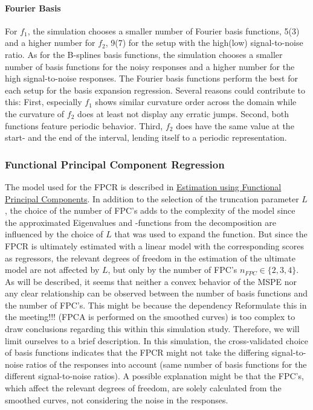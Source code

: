 \documentclass[11pt,twoside,a4paper]{article}
\begin{document}
	\paragraph{Fourier Basis}
	For $f_1$, the simulation chooses a smaller number of Fourier basis functions, 5(3) and a higher number for $f_2$, 9(7) for the setup with the high(low) signal-to-noise ratio. As for the B-splines basis functions, the simulation chooses a smaller number of basis functions for the noisy responses and a higher number for the high signal-to-noise responses. The Fourier basis functions perform the best for each setup for the basis expansion regression. Several reasons could contribute to this: First, especially $f_1$ shows similar curvature order across the domain while the curvature of $f_2$ does at least not display any erratic jumps. Second, both functions feature periodic behavior. Third, $f_2$ does have the same value at the start- and the end of the interval, lending itself to a periodic representation.
	\vspace{-0.2cm}
	
	\subsubsection{Functional Principal Component Regression}
	The model used for the FPCR is described in \hyperref[fpc_exp_transf]{Estimation using Functional Principal Components}. In addition to the selection of the truncation parameter $L$, the choice of the number of FPC's adds to the complexity of the model since the approximated Eigenvalues and -functions from the decomposition are influenced by the choice of $L$ that was used to expand the function. But since the FPCR is ultimately estimated with a linear model with the corresponding scores as regressors, the relevant degrees of freedom in the estimation of the ultimate model are not affected by $L$, but only by the number of FPC's $n_{FPC} \in \{2, 3, 4 \}$. As will be described, it seems that neither a convex behavior of the MSPE nor any clear relationship can be observed between the number of basis functions and the number of FPC's. This might be because the dependency {\color{red} Reformulate this in the meeting!!!} (FPCA is performed on the smoothed curves) is too complex to draw conclusions regarding this within this simulation study. Therefore, we will limit ourselves to a brief description. In this simulation, the cross-validated choice of basis functions indicates that the FPCR might not take the differing signal-to-noise ratios of the responses into account (same number of basis functions for the different signal-to-noise ratios). A possible explanation might be that the FPC's, which affect the relevant degrees of freedom, are solely calculated from the smoothed curves, not considering the noise in the responses.
	
\end{document}
